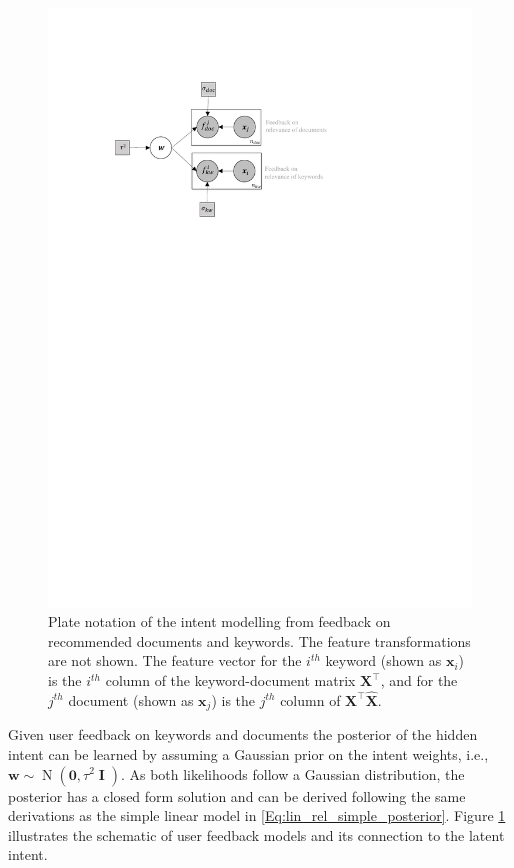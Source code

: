 \documentclass[dissertation,math,vertlayout,pdfa,colorlinks]{aaltoseries}
\newcommand{\bw}{\bm{w}}
\DeclareMathOperator{\eye}{\textbf{I}}
\DeclareMathOperator{\normalpdf}{N}
\newcommand{\tp}{^{\top}}
\begin{document}
\begin{figure}
	\centering
	\includegraphics[width=0.80\linewidth]{Figures/Plate_diagram_intent_kd.pdf}
	\caption{Plate notation of the intent modelling from feedback on recommended documents and keywords. The feature transformations are not shown. The feature vector for the $i^{th}$ keyword (shown as $\bm{x}_i$) is the $i^{th}$ column of the keyword-document matrix $\bm{X}\tp$, and for the $j^{th}$ document (shown as $\bm{x}_j$) is the $j^{th}$ column of $\bm{X}\tp\hat{\bm{X}}$.}
	\label{fig:Plate_intent_kd}
\end{figure}

Given user feedback on keywords and documents the posterior of the hidden intent can be learned by assuming a Gaussian prior on the intent weights, i.e., $\bw \sim \normalpdf(\bm{0},\tau^2 \eye)$. As both likelihoods follow a Gaussian distribution, the posterior has a closed form solution and can be derived following the same derivations as the simple linear model in \ref{Eq:lin_rel_simple_posterior}. Figure \ref{fig:Plate_intent_kd} illustrates the schematic of user feedback models and its connection to the latent intent. 
\end{document}
